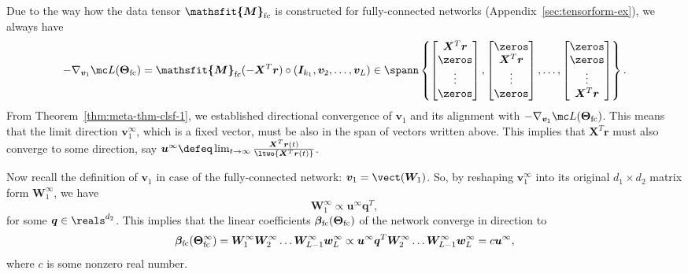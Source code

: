 \documentclass{article} %
\def\vq{{\bm{q}}}
\def\vr{{\bm{r}}}
\def\vu{{\bm{u}}}
\def\vv{{\bm{v}}}
\def\vw{{\bm{w}}}
\def\mI{{\bm{I}}}
\def\mW{{\bm{W}}}
\def\mX{{\bm{X}}}
\newcommand{\tens}[1]{\bm{\mathsfit{#1}}}
\def\tM{{\tens{M}}}
\newcommand{\vbeta}{{\bm{\beta}}}
\newcommand{\vbetafc}{\vbeta_{\rm fc}}
\newcommand{\bTheta}{\bm{\Theta}}
\newcommand{\bThetafc}{\bTheta_{\rm fc}}
\newcommand{\tMfc}{\tM_{\rm fc}}
\begin{document}
Due to the way how the data tensor $\tMfc$ is constructed for fully-connected networks (Appendix~\ref{sec:tensorform-ex}), we always have
\begin{equation*}
    -\nabla_{\vv_1}\mc L(\bThetafc) = \tMfc(-\mX^T\vr) \circ (\mI_{k_1}, \vv_2, \dots, \vv_L) \in
    \spann \left \{ 
    \begin{bmatrix}
    \mX^T\vr \\ \zeros \\ \vdots \\ \zeros
    \end{bmatrix},
    \begin{bmatrix}
    \zeros \\ \mX^T\vr \\ \vdots \\ \zeros
    \end{bmatrix},
    \dots,
    \begin{bmatrix}
    \zeros \\ \zeros \\ \vdots \\ \mX^T\vr
    \end{bmatrix}
    \right \}.
\end{equation*}
From Theorem~\ref{thm:meta-thm-clsf-1}, we established directional convergence of $\vv_1$ and its alignment with $-\nabla_{\vv_1}\mc L(\bThetafc)$. This means that the limit direction $\vv_1^\infty$, which is a fixed vector, must be also in the span of vectors written above. This implies that $\mX^T \vr$ must also converge to some direction, say $\vu^\infty \defeq \lim_{t \to \infty} \frac{\mX^T \vr(t)}{\ltwo{\mX^T \vr(t)}}$.

Now recall the definition of $\vv_1$ in case of the fully-connected network: $\vv_1 = \vect(\mW_1)$. So, by reshaping $\vv_1^\infty$ into its original $d_1 \times d_2$ matrix form $\mW_1^\infty$, we have
\begin{equation*}
    \mW_1^\infty \propto \vu^\infty \vq^T,
\end{equation*}
for some $\vq \in \reals^{d_2}$.
This implies that the linear coefficients $\vbetafc(\bThetafc)$ of the network converge in direction to
\begin{equation}
\label{eq:proof-clsf-fc-3}
    \vbetafc(\bThetafc^{\infty}) = \mW_1^\infty \mW_2^\infty \dots \mW_{L-1}^\infty \vw_L^\infty
    \propto \vu^\infty \vq^T \mW_2^\infty \dots \mW_{L-1}^\infty \vw_L^\infty
    = c \vu^\infty,
\end{equation}
where $c$ is some nonzero real number.
\end{document}
